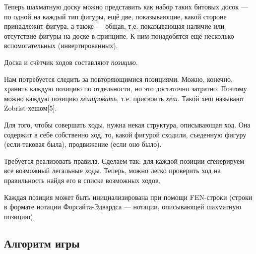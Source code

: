 {	Теперь шахматную доску можно представить как набор таких битовых досок --- по одной на каждый тип фигуры, ещё две, показывающие, какой стороне принадлежит фигура, а также --- общая, т.е. показывающая наличие или отсутствие фигуры на доске в принципе. К ним понадобятся ещё несколько вспомогательных (инвертированных).
	
	Доска и счётчик ходов составляют \textit{позицию}.
	
	Нам потребуется следить за повторяющимися позициями. Можно, конечно, хранить каждую позицию по отдельности, но это достаточно затратно. Поэтому можно каждую позицию \textit{хешировать}, т.е. присвоить \textit{хеш}. Такой хеш называют Zobrist-хешом[5].
	
	Для того, чтобы совершать ходы, нужна некая структура, описывающая ход. Она содержит в себе собственно ход, то, какой фигурой сходили, съеденную фигуру (если таковая была), продвижение (если оно было).
	
	Требуется реализовать правила. Сделаем так: для каждой позиции сгенерируем все возможный легальные ходы. Теперь, можно легко проверить ход на правильность найдя его в списке возможных ходов.
	
	Каждая позиция может быть инициализирована при помощи FEN-строки (строки в формате нотации Форсайта-Эдвардса --- нотации, описывающей шахматную позицию).
	
	\subsection{Алгоритм игры}
	 
	
}